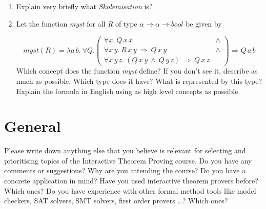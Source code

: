 \documentclass[a4paper,11pt,oneside]{scrartcl}
\begin{document}
\begin{enumerate}
\item Explain very briefly what \emph{Skolemisation} is?
\item Let the function \textit{myst} for all \textit{R} of type $\alpha \to \alpha \to \textit{bool}$ be given by 

\[
  \textit{myst}(\textit{R}) = \lambda a\, b.\ \forall Q. \left(
\begin{array}{cr}
      \forall x.\ Q\, x\, x\ & \wedge \\
      \forall x\,y.\ R\,x\,y\ \Longrightarrow\ Q\, x\, y\ & \wedge \\
      \forall x\,y\,z.\ (Q\,x\,y\ \wedge\  Q\,y\,z)\ \Longrightarrow\ Q\,x\,z 
\end{array}
\right)  \Longrightarrow Q\,a\,b
\] 
Which concept does the function \textit{myst} define? If you don't see it, describe as much
as possible. Which type does it have? What is represented by this type? Explain the formula in English using as high level concepts as possible. 

\end{enumerate}


\section{General}

Please write down anything else that you believe is relevant for
selecting and prioritising topics of the Interactive Theorem Proving
course.  Do you have any comments or suggestions? Why are you
attending the course? Do you have a concrete application in mind?
Have you used interactive theorem provers before? Which ones?  Do you
have experience with other formal method tools like model checkers,
SAT solvers, SMT solvers, first order provers \ldots? Which ones?
\end{document}
